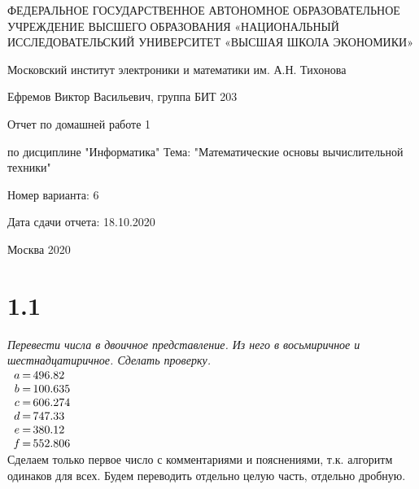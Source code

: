 \documentclass[a4paper,12pt]{article}
\begin{document}
\renewcommand{\arraystretch}{1.5}




\large
\begin{titlepage}
\begin{center}
ФЕДЕРАЛЬНОЕ ГОСУДАРСТВЕННОЕ АВТОНОМНОЕ ОБРАЗОВАТЕЛЬНОЕ УЧРЕЖДЕНИЕ ВЫСШЕГО ОБРАЗОВАНИЯ «НАЦИОНАЛЬНЫЙ ИССЛЕДОВАТЕЛЬСКИЙ УНИВЕРСИТЕТ «ВЫСШАЯ ШКОЛА ЭКОНОМИКИ»

\vspace{1cm}

Московский институт электроники и математики им. А.Н. Тихонова

\vspace{2cm}

Ефремов Виктор Васильевич, группа БИТ 203

\vspace{4cm}

Отчет
по домашней работе 1

по дисциплине "Информатика"
Тема: "Математические основы вычислительной техники"

\vspace{1cm}

Номер варианта: 6

Дата сдачи отчета: 18.10.2020

\vfill

Москва
2020
\end{center}
\end{titlepage}
\normalsize



\setcounter{page}{2}
\section*{1.1}

\textit{Перевести числа в двоичное представление. Из него в восьмиричное и шестнадцатиричное. Сделать проверку.}
\\

$\begin{array}{c @{\, = \,} r @{.} l}
a & 496 & 82 \\
b & 100 & 635 \\
c & 606 & 274 \\
d & 747 & 33 \\
e & 380 & 12 \\
f & 552 & 806 \\
\end{array}$
\\

Сделаем только первое число с комментариями и пояснениями, т.к. алгоритм одинаков для всех.
Будем переводить отдельно целую часть, отдельно дробную.
\end{document}

